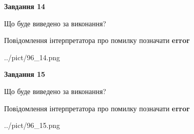 \documentclass[11pt, ukrainian]{article}
\begin{document}
{\begin {large}
{\begin {center}\textbf{Завдання 14}\end {center}}\par
Що буде виведено за виконання? \par
Повідомлення інтерпретатора про помилку позначати \textbf{error}

\begin{center}
	{../pict/96_14.png}
\end{center}
\newpage

{\begin {center}\textbf{Завдання 15}\end {center}}\par
Що буде виведено за виконання? \par
Повідомлення інтерпретатора про помилку позначати \textbf{error}

\begin{center}
	{../pict/96_15.png}
\end{center}
\newpage

\end {large}}
\end{document}
